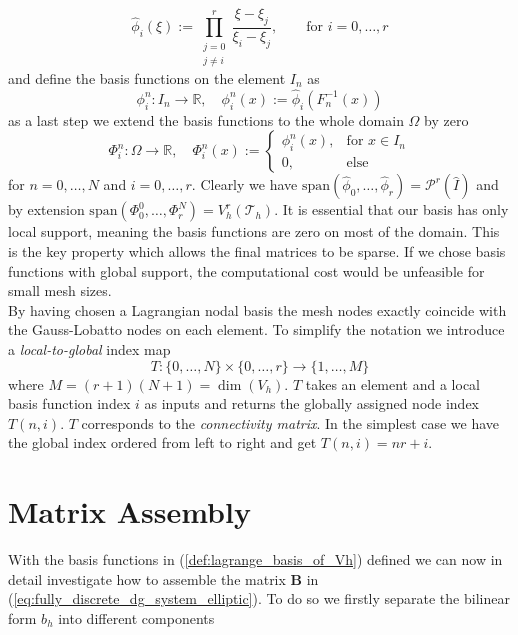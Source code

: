 \begin{equation}
    \label{def:lagrange_ref_basis}
    \widehat{\phi}_i(\xi) := \prod_{\substack{j = 0 \\ j\neq i}}^{r}\frac{\xi - \xi_j}{\xi_i - \xi_j},
    \qquad \text{for } i=0,\ldots,r 
\end{equation}
and define the basis functions on the element $I_n$ as 
\begin{equation}
    \phi^n_i : I_n \to \mathbb{R}, \quad \phi^n_i(x) := \widehat{\phi}_i(F_n^{-1}(x))
    \nonumber
\end{equation}
as a last step we extend the basis functions to the whole domain $\Omega$ by zero 
\begin{equation}
    \Phi_i^n: \Omega \to \mathbb{R}, \quad \Phi_i^n(x) := 
    \begin{cases}
        \phi_i^n(x),  & \text{for } x\in I_n \\
        0, & \text{else}
    \end{cases}
    \label{def:lagrange_basis_of_Vh}
\end{equation}
for $n=0,\ldots,N$ and $i=0,\ldots,r$. Clearly we have $\text{span}( \widehat{\phi}_0, \ldots, \widehat{\phi}_r) = \mathcal{P}^r(\hat{I})$
and by extension $\text{span}(\Phi_0^0,\ldots,\Phi_r^N) = V_h^r(\mathcal{T}_h)$. It is essential 
that our basis has only local support, meaning the basis functions are zero on most of the domain. This is the key property which 
allows the final matrices to be sparse. If we chose basis functions with global support, the computational cost would be unfeasible for 
small mesh sizes. \\
By having chosen a Lagrangian nodal basis the mesh nodes exactly coincide with the Gauss-Lobatto nodes on each
element. 
To simplify the notation we introduce a \textit{local-to-global} index map
\begin{equation}
    \label{def:local_to_global_map}
    T: \{0,\ldots,N\} \times \{0,\ldots,r\} \to \{1,\ldots,M\} 
\end{equation}
where $M = (r+1)(N+1) = \dim(V_h)$. $T$ takes an element and a local basis function index $i$ as inputs
and returns the globally assigned node index $T(n,i)$. $T$ corresponds to the 
\textit{connectivity matrix}. In the simplest case we have the global index ordered from left to right and get
$T(n,i) = nr + i$.


\section{Matrix Assembly}
With the basis functions in (\ref{def:lagrange_basis_of_Vh}) defined we can now in detail investigate how 
to assemble the matrix $\textbf{B}$ in (\ref{eq:fully_discrete_dg_system_elliptic}). To do so we firstly separate 
the bilinear form $b_h$ into different components

